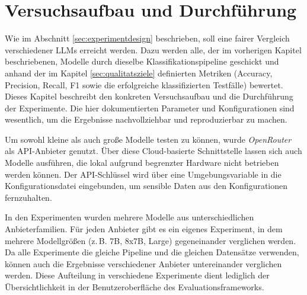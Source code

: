 \chapter{Versuchsaufbau und Durchführung}\label{ch:versuchsaufbau-und-durchfuhrung}

Wie im Abschnitt \ref{sec:experimentdesign} beschrieben, soll eine fairer Vergleich verschiedener \acp{LLM} erreicht werden. Dazu werden alle, der im vorherigen Kapitel beschriebenen, Modelle durch dieselbe Klassifikationspipeline geschickt und anhand der im Kapitel \ref{sec:qualitatsziele} definierten Metriken (Accuracy, Precision, Recall, F1 sowie die erfolgreiche klassifizierten Testfälle) bewertet. Dieses Kapitel beschreibt den konkreten Versuchsaufbau und die Durchführung der Experimente. Die hier dokumentierten Parameter und Konfigurationen sind wesentlich, um die Ergebnisse nachvollziehbar und reproduzierbar zu machen.

Um sowohl kleine als auch große Modelle testen zu können, wurde \emph{OpenRouter} \cite{openrouter} als API-Anbieter genutzt. Über diese Cloud-basierte Schnittstelle lassen sich auch Modelle ausführen, die lokal aufgrund begrenzter Hardware nicht betrieben werden können. Der API-Schlüssel wird über eine Umgebungsvariable in die Konfigurationsdatei eingebunden, um sensible Daten aus den Konfigurationen fernzuhalten.

In den Experimenten wurden mehrere Modelle aus unterschiedlichen Anbieterfamilien. Für jeden Anbieter gibt es ein eigenes Experiment, in dem mehrere Modellgrößen (z.\,B. 7B, 8x7B, Large) gegeneinander verglichen werden. Da alle Experimente die gleiche Pipeline und die gleichen Datensätze verwenden, können auch die Ergebnisse verschiedener Anbieter untereinander verglichen werden. Diese Aufteilung in verschiedene Experimente dient lediglich der Übersichtlichkeit in der Benutzeroberfläche des Evaluationsframeworks.




